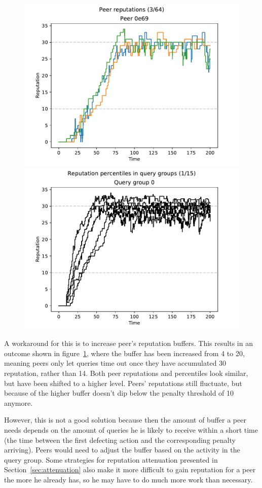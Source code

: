 \begin{figure}[t]
\centering
\includegraphics[width=0.5\columnwidth]{figures/expectations_off_no_att_high_buf_peer_reps_3_of_64}%
\includegraphics[width=0.5\columnwidth]{figures/expectations_off_no_att_high_buf_rep_percs_1_of_15}
\label{fig:penalty_expectations_off_no_att_high_buf_peer_reps_percs}
\end{figure}

A workaround for this is to increase peer's reputation buffers. This results in
an outcome shown in
figure~\ref{fig:penalty_expectations_off_no_att_high_buf_peer_reps_percs}, where
the buffer has been increased from 4 to 20, meaning peers only let queries time
out once they have accumulated 30 reputation, rather than 14. Both peer
reputations and percentiles look similar, but have been shifted to a higher
level. Peers' reputations still fluctuate, but because of the higher buffer
doesn't dip below the penalty threshold of 10 anymore.

However, this is not a good solution because then the amount of buffer a peer
needs depends on the amount of queries he is likely to receive within a short
time (the time between the first defecting action and the corresponding penalty
arriving). Peers would need to adjust the buffer based on the activity in the
query group. Some strategies for reputation attenuation presented in
Section~\ref{sec:attenuation} also make it more difficult to gain reputation for
a peer the more he already has, so he may have to do much more work than
necessary.

